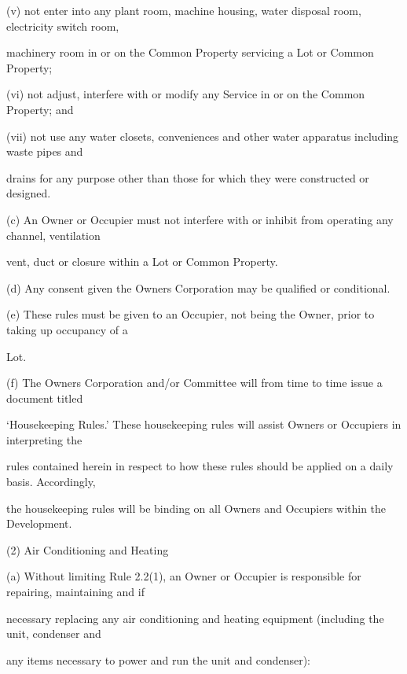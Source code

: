 \documentclass{article}
\begin{document}
{\fontsize{9.962}{1}(v) not enter into any plant room, machine housing, water disposal room, electricity switch room, }

{\fontsize{10.02}{1}machinery room in or on the Common Property servicing a Lot or Common Property; }

{\fontsize{9.962}{1}(vi) not adjust, interfere with or modify any Service in or on the Common Property; and }

{\fontsize{9.962}{1}(vii) not use any water closets, conveniences and other water apparatus including waste pipes and }

{\fontsize{10.02}{1}drains for any purpose other than those for which they were constructed or designed. }

{\fontsize{9.962}{1}(c) An Owner or Occupier must not interfere with or inhibit from operating any channel, ventilation }

{\fontsize{10.02}{1}vent, duct or closure within a Lot or Common Property. }

{\fontsize{9.962}{1}(d) Any consent given the Owners Corporation may be qualified or conditional. }

{\fontsize{9.962}{1}(e) These rules must be given to an Occupier, not being the Owner, prior to taking up occupancy of a }

{\fontsize{10.02}{1}Lot. }

{\fontsize{9.962}{1}(f) The Owners Corporation and/or Committee will from time to time issue a document titled }

{\fontsize{10.02}{1}‘Housekeeping Rules.’ These housekeeping rules will assist Owners or Occupiers in interpreting the }

{\fontsize{10.02}{1}rules contained herein in respect to how these rules should be applied on a daily basis. Accordingly, }

{\fontsize{10.02}{1}the housekeeping rules will be binding on all Owners and Occupiers within the Development. }

{\fontsize{9.962}{1}(2) Air Conditioning and Heating }

{\fontsize{9.962}{1}(a) Without limiting Rule 2.2(1), an Owner or Occupier is responsible for repairing, maintaining and if }

{\fontsize{10.02}{1}necessary replacing any air conditioning and heating equipment (including the unit, condenser and }

{\fontsize{10.02}{1}any items necessary to power and run the unit and condenser): }
\end{document}
